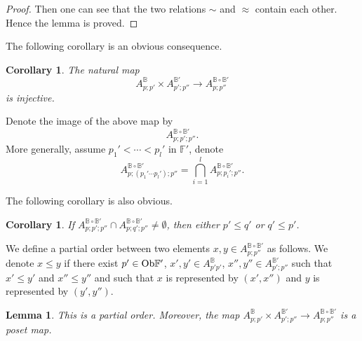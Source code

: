 \documentclass[reqno, 10pt]{amsart}
\numberwithin{equation}{section}
\numberwithin{equation}{section}
\newtheorem{cor}[thm]{Corollary}
\newtheorem{lemma}[thm]{Lemma}
\theoremstyle{definition}
\theoremstyle{remark}
\newcommand{\beqn}{\begin{equation*}}
\newcommand{\eeqn}{\end{equation*}}
\newcommand{\mb}{\mathbb}
\begin{document}
\begin{proof}
Then one can see that the two relations $\sim$ and $\approx$ contain each other. Hence the lemma is proved. 
\end{proof}

The following corollary is an obvious consequence.

\begin{cor}\label{cor_module_concatenation}
The natural map
\beqn
A_{p; p'}^{\mb B} \times  A_{p'; p''}^{{\mb B}'} \to A_{p; p''}^{{\mb B}\circ {\mb B}'}
\eeqn
is injective.
\end{cor}

Denote the image of the above map by 
\beqn
A_{p; p'; p''}^{{\mb B} \circ {\mb B}'}.
\eeqn
More generally, assume $p_1' < \cdots < p_l'$ in ${\mb F}'$, denote
\beqn
A_{p; (p_1'\cdots p_l'); p''}^{{\mb B} \circ {\mb B}'} = \bigcap_{i =1}^l A_{p; p_i'; p''}^{{\mb B}\circ {\mb B}'}. 
\eeqn

The following corollary is also obvious.

\begin{cor}
If $A_{p; p'; p''}^{{\mb B} \circ {\mb B}'} \cap A_{p; q'; p''}^{{\mb B}\circ {\mb B}'} \neq \emptyset$, then either $p' \leq q'$ or $q' \leq p'$.
\end{cor}

We define a partial order between two elements $x, y\in A_{p; p''}^{{\mb B} \circ {\mb B}'}$ as follows. We denote $x \leq y$ if there exist $p' \in {\rm Ob}{\mb F}'$, $x', y' \in A_{p'p'}^{\mb B}$, $x'', y''\in A_{p';p''}^{{\mb B}'}$ such that $x' \leq y'$ and $x'' \leq y''$ and such that $x$ is represented by $(x', x'')$ and $y$ is represented by $(y', y'')$. 

\begin{lemma}\label{lemma_concatenation_partial_order}
This is a partial order. Moreover, the map $A_{p; p'}^{\mb B} \times A_{p'; p''}^{{\mb B}'} \to A_{p; p''}^{{\mb B} \circ {\mb B}'}$ is a poset map.
\end{lemma}
\end{document}
